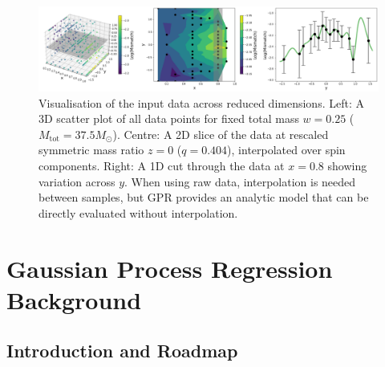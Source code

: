 \documentclass{ucdgradtaughtthesis}
\begin{document}
    \begin{figure}[H]
        \centering
        \includegraphics[width=\textwidth]{LatexPlots/final_gps_plots/data_visual.png}
        \caption[Visualisation of the input data across reduced dimensions.]{
        Visualisation of the input data across reduced dimensions. 
        Left: A 3D scatter plot of all data points for fixed total mass \(w = 0.25\) ($M_\text{tot}=37.5 M_\odot$). 
        Centre: A 2D slice of the data at rescaled symmetric mass ratio \(z = 0\) ($q=0.404$), interpolated over spin components.
        Right: A 1D cut through the data at \(x = 0.8\) showing variation across \(y\). 
        When using raw data, interpolation is needed between samples, but GPR provides an analytic model that can be directly evaluated without interpolation.
        }
        \label{fig:visualising_data}
    \end{figure}







\chapter{Gaussian Process Regression Background}
\section{Introduction and Roadmap}
\end{document}

